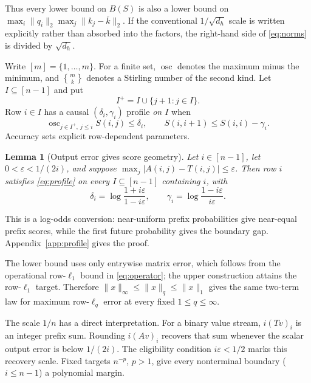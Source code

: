 \documentclass[10pt]{article} %
\newtheorem{lemma}[theorem]{Lemma}
\theoremstyle{definition}
\DeclareMathOperator{\osc}{osc}
\newcommand{\Stirling}[2]{\genfrac{\{}{\}}{0pt}{}{#1}{#2}}
\begin{document}
Thus every lower bound on \(B(S)\) is also a lower bound on
\(\max_i\|q_i\|_2\max_j\|k_j-\bar k\|_2\).  If the conventional
\(1/\sqrt{d_h}\) scale is written explicitly rather than absorbed into the
factors, the right-hand side of \eqref{eq:norms} is divided by \(\sqrt{d_h}\).

Write \([m]=\{1,\ldots,m\}\).  For a finite set, \(\osc\) denotes the maximum
minus the minimum, and \(\Stirling{m}{k}\) denotes a Stirling number of the
second kind.  Let
\(I\subseteq[n-1]\) and put
\[
 I^+=I\cup\{j+1:j\in I\}.
\]
Row \(i\in I\) has a causal \((\delta_i,\gamma_i)\) profile
\emph{on \(I\)} when
\begin{equation}\label{eq:profile}
 \osc_{j\in I^+,\ j\le i}S(i,j)\le\delta_i,
 \qquad S(i,i+1)\le S(i,i)-\gamma_i.
\end{equation}
Accuracy sets explicit row-dependent parameters.

\begin{lemma}[Output error gives score geometry]\label{lem:profile}
Let \(i\in[n-1]\), let \(0<\varepsilon<1/(2i)\), and suppose
\(\max_j|A(i,j)-T(i,j)|\le\varepsilon\).  Then row \(i\) satisfies
\eqref{eq:profile} on every \(I\subseteq[n-1]\) containing \(i\), with
\begin{equation}\label{eq:rowprofile}
 \delta_i=\log\frac{1+i\varepsilon}{1-i\varepsilon},
 \qquad
 \gamma_i=\log\frac{1-i\varepsilon}{i\varepsilon}.
\end{equation}
\end{lemma}

This is a log-odds conversion: near-uniform prefix probabilities give
near-equal prefix scores, while the first future probability gives the
boundary gap.  Appendix~\ref{app:profile} gives the proof.

The lower bound uses only entrywise matrix error, which follows from the
operational row-\(\ell_1\) bound in \eqref{eq:operator}; the upper construction
attains the row-\(\ell_1\) target.  Therefore
\(\|x\|_\infty\le\|x\|_q\le\|x\|_1\) gives the same two-term law for maximum
row-\(\ell_q\) error at every fixed \(1\le q\le\infty\).

The scale \(1/n\) has a direct interpretation.  For a binary value stream,
\(i(Tv)_i\) is an integer prefix sum.  Rounding \(i(Av)_i\) recovers that sum
whenever the scalar output error is below \(1/(2i)\).  The eligibility
condition \(i\varepsilon<1/2\) marks this recovery scale.  Fixed targets
\(n^{-p}\), \(p>1\), give every nonterminal boundary (\(i\le n-1\)) a
polynomial margin.
\end{document}
